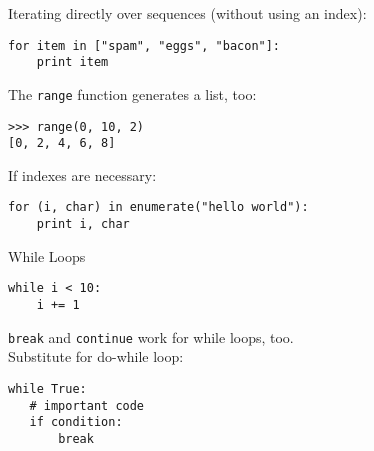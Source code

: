 \begin{frame}[fragile]
Iterating directly over sequences (without using an index):
\begin{lstlisting}[style=Python]
for item in ["spam", "eggs", "bacon"]:
    print item
\end{lstlisting}

The \texttt{range} function generates a list, too:
\begin{lstlisting}[style=Shell]
>>> range(0, 10, 2)
[0, 2, 4, 6, 8]
\end{lstlisting}
If indexes are necessary:
\begin{lstlisting}[style=Python]
for (i, char) in enumerate("hello world"):
    print i, char
\end{lstlisting}
\end{frame}

\begin{frame}[fragile]{While Loops}
\begin{lstlisting}[style=Python]
while i < 10:
    i += 1
\end{lstlisting}
\lstinline{break} and \lstinline{continue} work for while loops, too.\\[3mm]
Substitute for do-while loop:
\begin{lstlisting}[style=Python]
while True:
   # important code
   if condition:
       break
\end{lstlisting} 
\end{frame}

